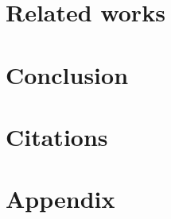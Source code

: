 \documentclass[12pt]{article}
\begin{document}
\section{Related works}



\section{Conclusion}



\section{Citations}
\cite{ahlawat2020improved}
\cite{liu2020comparisions}
\cite{pashine2021handwritten}
\cite{wu2017introduction}
\cite{726791}








\newpage



\appendix
\section{Appendix}
\end{document}
